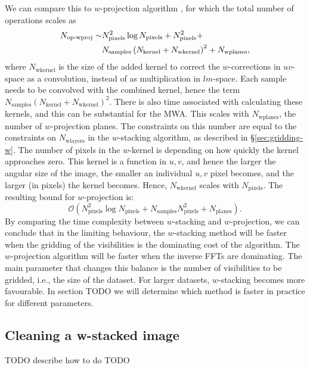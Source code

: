 \documentclass[useAMS,usenatbib]{mn2e}
\begin{document}
We can compare this to $w$-projection algorithm \citep{wprojection-cornwell}, for which the total number of operations scales as
\begin{align} \notag
 N_\textrm{op-wproj} \sim & N^2_\textrm{pixels} \log N_\textrm{pixels} + N^2_\textrm{pixels} + \\
 & N_\textrm{samples} \left( N_\textrm{kernel} + N_\textrm{wkernel} \right)^2 + N_\textrm{wplanes},
\end{align}
where $N_\textrm{wkernel}$ is the size of the added kernel to correct the $w$-corrections in $uv$-space as a convolution, instead of as multiplication in $lm$-space. Each sample needs to be convolved with the combined kernel, hence the term $N_\textrm{samples} \left( N_\textrm{kernel} + N_\textrm{wkernel} \right)^2$. There is also time associated with calculating these kernels, and this can be substantial for the MWA. This scales with $N_\textrm{wplanes}$, the number of $w$-projection planes. The constraints on this number are equal to the constraints on $N_\textrm{wlayers}$ in the $w$-stacking algorithm, as described in \S\ref{sec:gridding-w}. The number of pixels in the $w$-kernel is depending on how quickly the kernel approaches zero. This kernel is a function in $u,v$, and hence the larger the angular size of the image, the smaller an individual $u,v$ pixel becomes, and the larger (in pixels) the kernel becomes. Hence, $N_\textrm{wkernel}$ scales with $N_\textrm{pixels}$. The resulting bound for $w$-projection is:
\begin{equation}
\mathcal{O}\left(N^2_\textrm{pixels} \log N_\textrm{pixels} + N_\textrm{samples} N^2_\textrm{pixels} + N_\textrm{planes} \right).
\end{equation}
By comparing the time complexity between $w$-stacking and $w$-projection, we can conclude that in the limiting behaviour, the $w$-stacking method will be faster when the gridding of the visibilities is the dominating cost of the algorithm. The $w$-projection algorithm will be faster when the inverse FFTs are dominating. The main parameter that changes this balance is the number of visibilities to be gridded, i.e., the size of the dataset. For larger datasets, $w$-stacking becomes more favourable. In section TODO we will determine which method is faster in practice for different parameters.

\subsection{Cleaning a w-stacked image}
TODO describe how to do
TODO \citet{hogbom-clean}
\end{document}
